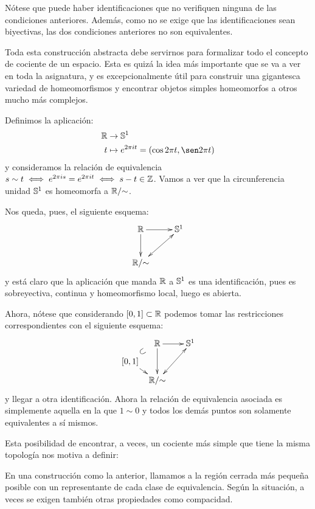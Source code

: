 Nótese que puede haber identificaciones que no verifiquen ninguna de las condiciones anteriores. Además, como no se exige que las identificaciones sean biyectivas, las dos condiciones anteriores no son equivalentes.

Toda esta construcción abstracta debe servirnos para formalizar todo el concepto de cociente de un espacio. Esta es quizá la idea más importante que se va a ver en toda la asignatura, y es excepcionalmente útil para construir una gigantesca variedad de homeomorfismos y encontrar objetos simples homeomorfos a otros mucho más complejos.



\begin{exa}
	Definimos la aplicación:
	\[\begin{split}
	\R&\to\esfera^1 \\
	t&\mapsto e^{2\pi it}=(\cos 2\pi t,\sen 2\pi t)
	\end{split}\]
	y consideramos la relación de equivalencia $s\sim t\iff e^{2\pi is}=e^{2\pi it}\iff s-t\in\mathbb{Z}$. Vamos a ver que la circunferencia unidad $\mathbb{S}^1$ es homeomorfa a $\mathbb{R}/\mathord{\sim}$.
	
	Nos queda, pues, el siguiente esquema:
	\[\xymatrix{
		\R \ar[r] \ar[d] &
		\esfera^1 \\
		\R/\mathord{\sim}  \ar@{<->}[ru]
	}\]
	y está claro que la aplicación que manda $\mathbb{R}$ a $\mathbb{S}^1$ es una identificación, pues es sobreyectiva, continua y homeomorfismo local, luego es abierta.
	
	Ahora, nótese que considerando $[0,1]\subset\mathbb{R}$ podemos tomar las restricciones correspondientes con el siguiente esquema:
	\[\xymatrix @C=0.5pc @R=0.5pc @L=-0.2pc {
		& \R \ar[rr] \ar[dd] & &
		\esfera^1 \\
		[0,1] \ar@{}[ur]^*[@]{\subset} \ar[dr] \\
		& \R/\mathord{\sim}  \ar@{<->}[rruu]
	}\]
	y llegar a otra identificación. Ahora la relación de equivalencia asociada es simplemente aquella en la que $1\sim 0$ y todos los demás puntos son solamente equivalentes a sí mismos.
\end{exa}

Esta posibilidad de encontrar, a veces, un cociente más simple que tiene la misma topología nos motiva a definir:

\begin{defi}
	En una construcción como la anterior, llamamos  a la región cerrada más pequeña posible con un representante de cada clase de equivalencia. Según la situación, a veces se exigen también otras propiedades como compacidad.
\end{defi}

